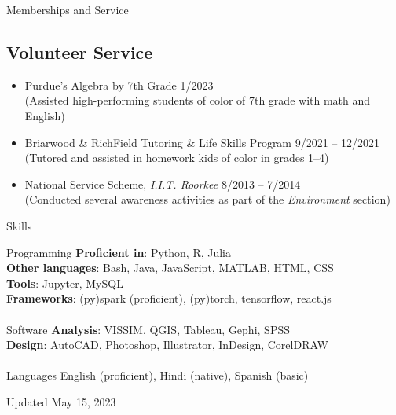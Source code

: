 \documentclass{CV} %
\begin{document}
\begin{rSection}{Memberships and Service}
    \subsection*{Volunteer Service}
    \begin{itemize}
        \item Purdue's Algebra by 7th Grade \hfill 1/2023
        \\ (Assisted high-performing students of color of 7th grade with math and English)
        \item Briarwood \& RichField Tutoring \& Life Skills Program \hfill 9/2021 – 12/2021
        \\ (Tutored and assisted in homework kids of color in grades 1–4)
        \item National Service Scheme, \textit{I.I.T. Roorkee} \hfill 8/2013 – 7/2014
        \\ (Conducted several awareness activities as part of the \textit{Environment} section)
    \end{itemize}

\end{rSection}

\begin{rSection}{Skills}
    \begin{tabbing}
    Programming \hspace*{0.5cm} \= \textbf{Proficient in}: Python, R, Julia \\
    \> \textbf{Other languages}: Bash, Java, JavaScript, MATLAB, HTML, CSS
    \\ \> \textbf{Tools}: Jupyter, MySQL
    \\ \> \textbf{Frameworks}: (py)spark (proficient), (py)torch, tensorflow, react.js \\

    \\ Software
       \> \textbf{Analysis}: VISSIM, QGIS, Tableau, Gephi, SPSS
    \\ \> \textbf{Design}: AutoCAD, Photoshop, Illustrator, InDesign, CorelDRAW \\
    \\ Languages \> English (proficient), Hindi (native), Spanish (basic)
    \end{tabbing}
\end{rSection}

\vspace*{\fill}
\centering Updated May 15, 2023
\end{document}
